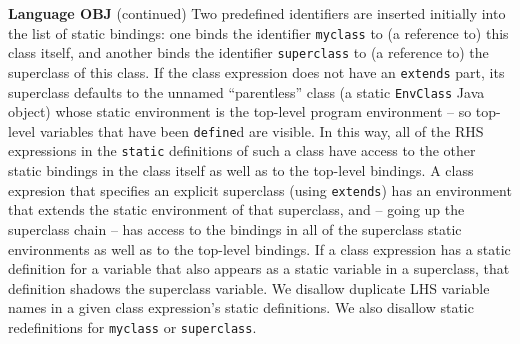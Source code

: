 \begin{minipage}[t]{\sw}
\slidenumber
\LARGE
{\bf Language OBJ} (continued)\exx
Two predefined identifiers are inserted initially into the list
of static bindings:
one binds the identifier \verb'myclass'
to (a reference to) this class itself,
and another binds the identifier \verb'superclass'
to (a reference to) the superclass of this class.\exx
If the class expression does not have an \verb'extends' part, 
its superclass defaults to the unnamed ``parentless'' class
(a static \verb'EnvClass' Java object)
whose static environment is the top-level program environment --
so top-level variables that have been \verb'define'd are visible.
In this way, all of the RHS expressions in the \verb'static' definitions
of such a class have access
to the other static bindings in the class itself
as well as to the top-level bindings.\exx
A class expresion that specifies an explicit superclass
(using \verb'extends')
has an environment that extends
the static environment of that superclass,
and -- going up the superclass chain --
has access to the bindings in all
of the superclass static environments
as well as to the top-level bindings.\exx
If a class expression has a static definition for a variable
that also appears as a static variable in a superclass,
that definition shadows the superclass variable.
We disallow duplicate LHS variable names
in a given class expression's static definitions.
We also disallow static redefinitions
for \verb'myclass' or \verb'superclass'.
\end{minipage}
